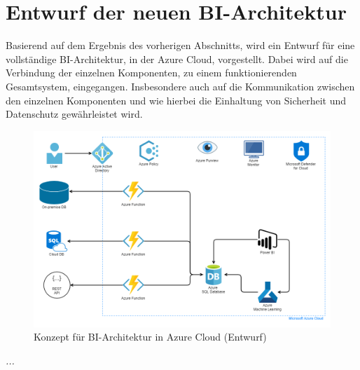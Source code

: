 \section{Entwurf der neuen BI-Architektur} \label{sec:entwurfBIArchitektur}
Basierend auf dem Ergebnis des vorherigen Abschnitts, wird ein Entwurf für eine vollständige BI-Architektur, in der Azure Cloud, vorgestellt. Dabei wird auf die Verbindung der einzelnen Komponenten, zu einem funktionierenden Gesamtsystem, eingegangen. Insbesondere auch auf die Kommunikation zwischen den einzelnen Komponenten und wie hierbei die Einhaltung von Sicherheit und Datenschutz gewährleistet wird.

\begin{figure}[htbp]
 \centering
 \includegraphics[width=\textwidth]{gfx/chap03_konzept_architektur.png}
 \caption{Konzept für BI-Architektur in Azure Cloud (Entwurf)}
\label{fig:chap03_4_konzeptArchitektur}
\end{figure}

\textit{...}